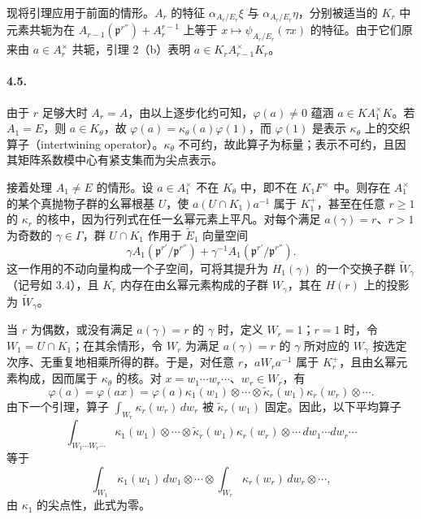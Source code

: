 现将引理应用于前面的情形。$A_r$ 的特征 $\alpha_{A_r/E_r}\xi$ 与 $\alpha_{A_r/E_r}\eta$，分别被适当的 $K_r$ 中元素共轭为在 $A_{r-1}(\mathfrak p^{r''})+A_r^{r-1}$ 上等于 $x\mapsto\psi_{A_r/E_r}(\tau x)$ 的特征。由于它们原来由 $a\in A_r^\times$ 共轭，引理 2（b）表明 $a\in K_rA_{r-1}^\times K_r$。
\paragraph*{4.5.}由于 $r$ 足够大时 $A_r=A$，由以上逐步化约可知，$\varphi(a)\ne0$ 蕴涵 $a\in KA_1^\times K$。若 $A_1=E$，则 $a\in K_\theta$，故 $\varphi(a)=\kappa_\theta(a)\varphi(1)$，而 $\varphi(1)$ 是表示 $\kappa_\theta$ 上的交织算子（intertwining operator）。$\kappa_\theta$ 不可约，故此算子为标量；表示不可约，且因其矩阵系数模中心有紧支集而为尖点表示。

接着处理 $A_1\ne E$ 的情形。设 $a\in A_1^\times$ 不在 $K_\theta$ 中，即不在 $K_1F^\times$ 中。则存在 $A_1^\times$ 的某个真抛物子群的幺幂根基 $U$，使 $a(U\cap K_1)a^{-1}$ 属于 $K_1^+$，甚至在任意 $r\geq1$ 的 $\kappa_r$ 的核中，因为行列式在任一幺幂元素上平凡。对每个满足 $a(\gamma)=r$、$r>1$ 为奇数的 $\gamma\in\Gamma$，群 $U\cap K_1$ 作用于 $\widetilde E_1$ 向量空间
\[
\gamma A_1(\mathfrak p^{r'}/\mathfrak p^{r''})+\gamma^{-1}A_1(\mathfrak p^{r'}/\mathfrak p^{r''}).
\]
这一作用的不动向量构成一个子空间，可将其提升为 $H_1(\gamma)$ 的一个交换子群 $\widetilde W_\gamma$（记号如 3.4），且 $K_r$ 内存在由幺幂元素构成的子群 $W_\gamma$，其在 $H(r)$ 上的投影为 $\widetilde W_\gamma$。

当 $r$ 为偶数，或没有满足 $a(\gamma)=r$ 的 $\gamma$ 时，定义 $W_r=1$；$r=1$ 时，令 $W_1=U\cap K_1$；在其余情形，令 $W_r$ 为满足 $a(\gamma)=r$ 的 $\gamma$ 所对应的 $W_\gamma$ 按选定次序、无重复地相乘所得的群。于是，对任意 $r$，$aW_ra^{-1}$ 属于 $K_r^+$，且由幺幂元素构成，因而属于 $\kappa_\theta$ 的核。对 $x=w_1\cdots w_r\cdots$、$w_r\in W_r$，有
\[
\varphi(a)=\varphi(ax)=\varphi(a)\kappa_1(w_1)\otimes\cdots\otimes\widetilde\kappa_r(w_1)\kappa_r(w_r)\otimes\cdots.
\]
由下一个引理，算子 $\int_{W_r}\kappa_r(w_r)\,dw_r$ 被 $\widetilde\kappa_r(w_1)$ 固定。因此，以下平均算子
\[
\int_{W_1\cdots W_r\cdots}\kappa_1(w_1)\otimes\cdots\otimes\widetilde\kappa_r(w_1)\kappa_r(w_r)\otimes\cdots\,dw_1\cdots dw_r\cdots
\]
等于
\[
\int_{W_1}\kappa_1(w_1)\,dw_1\otimes\cdots\otimes\int_{W_r}\kappa_r(w_r)\,dw_r\otimes\cdots,
\]
由 $\kappa_1$ 的尖点性，此式为零。

